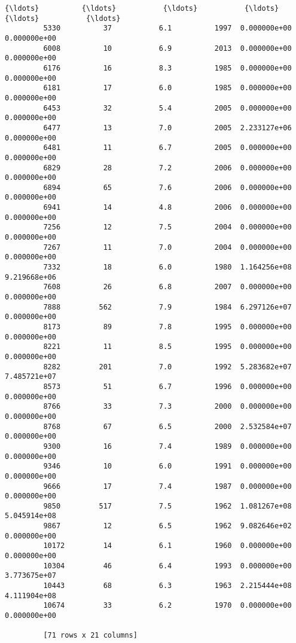 \documentclass[11pt]{article}
\begin{document}
\begin{Verbatim}[commandchars=\\\{\}]
         {\ldots}          {\ldots}           {\ldots}           {\ldots}           {\ldots}           {\ldots}  
         5330          37           6.1          1997  0.000000e+00  0.000000e+00  
         6008          10           6.9          2013  0.000000e+00  0.000000e+00  
         6176          16           8.3          1985  0.000000e+00  0.000000e+00  
         6181          17           6.0          1985  0.000000e+00  0.000000e+00  
         6453          32           5.4          2005  0.000000e+00  0.000000e+00  
         6477          13           7.0          2005  2.233127e+06  0.000000e+00  
         6481          11           6.7          2005  0.000000e+00  0.000000e+00  
         6829          28           7.2          2006  0.000000e+00  0.000000e+00  
         6894          65           7.6          2006  0.000000e+00  0.000000e+00  
         6941          14           4.8          2006  0.000000e+00  0.000000e+00  
         7256          12           7.5          2004  0.000000e+00  0.000000e+00  
         7267          11           7.0          2004  0.000000e+00  0.000000e+00  
         7332          18           6.0          1980  1.164256e+08  9.219668e+06  
         7608          26           6.8          2007  0.000000e+00  0.000000e+00  
         7888         562           7.9          1984  6.297126e+07  0.000000e+00  
         8173          89           7.8          1995  0.000000e+00  0.000000e+00  
         8221          11           8.5          1995  0.000000e+00  0.000000e+00  
         8282         201           7.0          1992  5.283682e+07  7.485721e+07  
         8573          51           6.7          1996  0.000000e+00  0.000000e+00  
         8766          33           7.3          2000  0.000000e+00  0.000000e+00  
         8768          67           6.5          2000  2.532584e+07  0.000000e+00  
         9300          16           7.4          1989  0.000000e+00  0.000000e+00  
         9346          10           6.0          1991  0.000000e+00  0.000000e+00  
         9666          17           7.4          1987  0.000000e+00  0.000000e+00  
         9850         517           7.5          1962  1.081267e+08  5.045914e+08  
         9867          12           6.5          1962  9.082646e+02  0.000000e+00  
         10172         14           6.1          1960  0.000000e+00  0.000000e+00  
         10304         46           6.4          1993  0.000000e+00  3.773675e+07  
         10443         68           6.3          1963  2.215444e+08  4.111904e+08  
         10674         33           6.2          1970  0.000000e+00  0.000000e+00  
         
         [71 rows x 21 columns]
\end{Verbatim}
            
\end{document}
